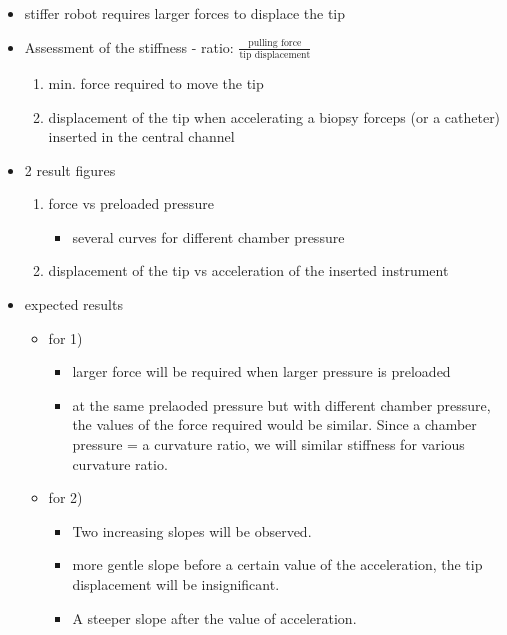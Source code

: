 \documentclass[journal,onecolumn]{IEEEtran}
\begin{document}
\begin{itemize}
\item stiffer robot requires larger forces to displace the tip
\item Assessment of the stiffness - ratio: \(\frac{\textrm{pulling force}}{\textrm{tip displacement}}\)
\begin{enumerate}
\item min. force required to move the tip
\item displacement of the tip when accelerating a biopsy forceps (or a catheter) inserted in the central channel
\end{enumerate}
\item 2 result figures
\begin{enumerate}
\item force vs preloaded pressure
\begin{itemize}
\item several curves for different chamber pressure
\end{itemize}
\item displacement of the tip vs acceleration of the inserted instrument
\end{enumerate}
\item expected results
\begin{itemize}
\item for 1)
\begin{itemize}
\item larger force will be required when larger pressure is preloaded
\item at the same prelaoded pressure but with different chamber pressure, the values of the force required would be similar. Since a chamber pressure = a curvature ratio, we will similar stiffness for various curvature ratio.
\end{itemize}
\item for 2)
\begin{itemize}
\item Two increasing slopes will be observed.
\item more gentle slope before a certain value of the acceleration, the tip displacement will be insignificant.
\item A steeper slope after the value of acceleration.
\end{itemize}
\end{itemize}
\end{itemize}
\end{document}
